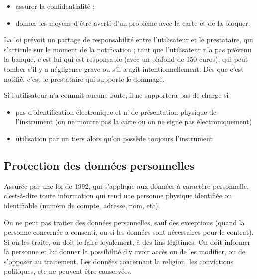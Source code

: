 			\begin{itemize}
				\item assurer la confidentialité ;
				\item donner les moyens d'être averti d'un problème avec la carte et de la bloquer.
			\end{itemize}
			
			La loi prévoit un partage de responsabilité entre l'utilisateur et le prestataire, qui s'articule sur le moment de la notification ; tant que l'utilisateur n'a pas prévenu la banque, c'est lui qui est responsable (avec un plafond de 150 euros), qui peut tomber s'il y a négligence grave ou s'il a agit intentionnellement. Dès que c'est notifié, c'est le prestataire qui supporte le dommage.
			
			Si l'utilisateur n'a commit aucune faute, il ne supportera pas de charge si
			
			\begin{itemize}
				\item pas d'identification électronique et ni de présentation physique de l'instrument (on ne montre pas la carte ou on ne signe pas électroniquement)
				\item utilisation par un tiers alors qu'on possède toujours l'instrument
			\end{itemize}
			
			
			
		\subsection{Protection des données personnelles}
			
		Assurée par une loi de 1992, qui s'applique aux données à caractère personnelle, c'est-à-dire toute information qui rend une personne physique identifiée ou identifiable (numéro de compte, adresse, nom, etc).
		
		On ne peut pas traiter des données personnelles, sauf des exceptions (quand la personne concernée a consenti, ou si les données sont nécessaires pour le contrat). Si on les traite, on doit le faire loyalement, à des fins légitimes. On doit informer la personne et lui donner la possibilité d'y avoir accès ou de les modifier, ou de s'opposer au traitement. Les données concernant la religion, les convictions politiques, etc ne peuvent être conservées.